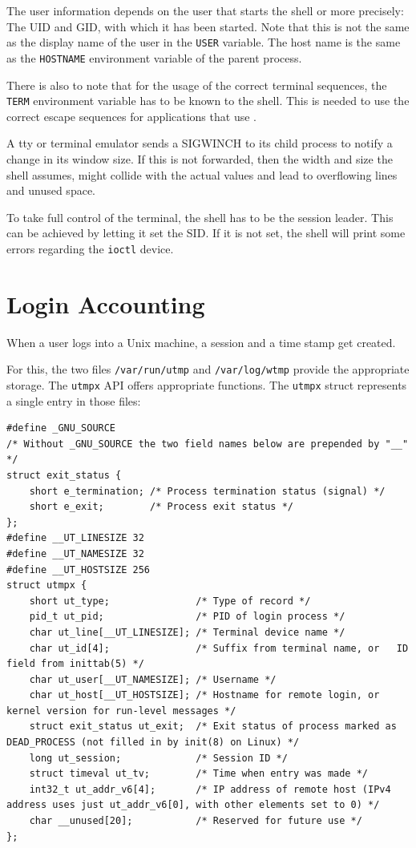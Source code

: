 \documentclass[10pt,a4paper,titlepage,twoside,english,final]{zhawreprt}
\begin{document}
The user information depends on the user that starts the shell or more precisely:
The \gls{UID} and \gls{GID}, with which it has been started.
Note that this is not the same as the display name of the user in the \texttt{USER} variable.
The host name is the same as the \texttt{HOSTNAME} environment variable of the parent process.

There is also to note that for the usage of the correct terminal sequences, the \texttt{TERM} environment variable has to be known to the \gls{shell}.
This is needed to use the correct escape sequences for applications that use \cite{ncurses}.

A \gls{tty} or terminal emulator sends a \gls{SIGWINCH} to its child process to notify a change in its window size.
If this is not forwarded, then the width and size the shell assumes, might collide with the actual values and lead to overflowing lines and unused space.

To take full control of the terminal, the \gls{shell} has to be the session leader.
This can be achieved by letting it set the \gls{SID}.
If it is not set, the \gls{shell} will print some errors regarding the \texttt{ioctl} device.

\section{Login Accounting}\label{sec:DesignLoginAccounting}
When a user logs into a \gls{Unix} machine, a session and a time stamp get created.

For this, the two files \texttt{/var/run/utmp} and \texttt{/var/log/wtmp} provide the appropriate storage.
The \texttt{utmpx} \gls{API} offers appropriate functions.
The \texttt{utmpx} struct represents a single entry in those files:
\setlistingC
\begin{lstlisting}[caption={Definition of the utmpx structure {\citep[p.819]{KerriskTLPI}}},label=lst:UtmpxDefinition]
#define _GNU_SOURCE
/* Without _GNU_SOURCE the two field names below are prepended by "__" */
struct exit_status {
	short e_termination; /* Process termination status (signal) */
	short e_exit; 		 /* Process exit status */
};
#define __UT_LINESIZE 32
#define __UT_NAMESIZE 32
#define __UT_HOSTSIZE 256
struct utmpx {
	short ut_type; 				 /* Type of record */
	pid_t ut_pid; 				 /* PID of login process */
	char ut_line[__UT_LINESIZE]; /* Terminal device name */
	char ut_id[4]; 				 /* Suffix from terminal name, or	ID field from inittab(5) */
	char ut_user[__UT_NAMESIZE]; /* Username */
	char ut_host[__UT_HOSTSIZE]; /* Hostname for remote login, or kernel version for run-level messages */
	struct exit_status ut_exit;  /* Exit status of process marked as DEAD_PROCESS (not filled in by init(8) on Linux) */
	long ut_session; 			 /* Session ID */
	struct timeval ut_tv; 		 /* Time when entry was made */
	int32_t ut_addr_v6[4]; 		 /* IP address of remote host (IPv4 address uses just ut_addr_v6[0], with other elements set to 0) */
	char __unused[20]; 			 /* Reserved for future use */
};
\end{lstlisting}
\end{document}
